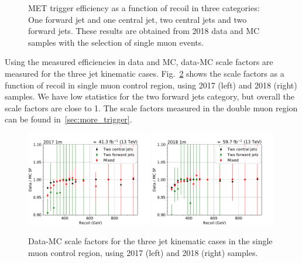 \begin{figure}[hbp]
\begin{center}
    \end{center}
    \caption{MET trigger efficiency as a function of recoil in three categories: One forward jet and one central jet, two central jets and
            two forward jets. These results are obtained from 2018 data and MC samples with the selection of single muon events.}
    \label{fig:eff_recoil_2018_1m}
\end{figure}

Using the measured efficiencies in data and MC, data-MC scale factors are measured for the three jet kinematic cases. 
Fig.~\ref{fig:sf_recoil_1m} shows the scale factors as a function of recoil in single muon control region, using 2017 (left)
and 2018 (right) samples. We have low statistics for the two forward jets category, but overall the scale factors are close to 1.
The scale factors measured in the double muon region can be found in~\ref{sec:more_trigger}.

\begin{figure}[hbp]
    \begin{center}
        \includegraphics[width=0.49\textwidth]{fig/efficiency/trigger/met/recoil/scale_factors_1m_2017.pdf}
        \includegraphics[width=0.49\textwidth]{fig/efficiency/trigger/met/recoil/scale_factors_1m_2018.pdf} 
    \end{center}
    \caption{Data-MC scale factors for the three jet kinematic cases in the single muon control region, using 2017 (left) and 2018 (right) samples.}
    \label{fig:sf_recoil_1m}
\end{figure}

